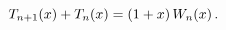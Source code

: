\[\mathop{T_{n+1}\/}\nolimits\!\left(x\right)+\mathop{T_{n}\/}\nolimits\!\left(x%
\right)=(1+x)\mathop{W_{n}\/}\nolimits\!\left(x\right).\]